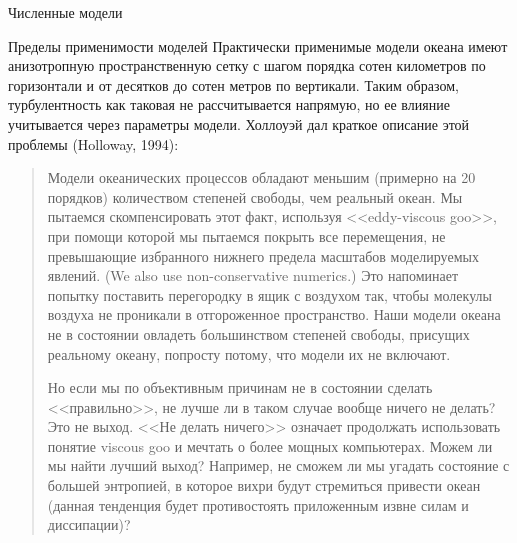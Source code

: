 \begin{chapter}{Численные модели}
\begin{section}{Пределы применимости моделей}
Практически применимые модели океана имеют анизотропную пространственную сетку 
с шагом порядка сотен километров по горизонтали и от десятков до сотен
метров по вертикали. Таким образом, турбулентность 
как таковая не рассчитывается напрямую, но ее влияние учитывается 
через параметры модели. Холлоуэй дал краткое описание этой
проблемы (Holloway, 1994):
%
\begin{quotation}
Модели океанических процессов обладают меньшим (примерно на 20 порядков)
количеством степеней свободы, чем реальный океан. Мы пытаемся скомпенсировать
этот факт, используя <<eddy-viscous goo>>, при помощи которой мы пытаемся
покрыть все перемещения, не превышающие избранного нижнего предела масштабов
моделируемых явлений. (We also use non-conservative numerics.) 
Это напоминает попытку поставить перегородку в ящик с воздухом так,
чтобы молекулы воздуха не проникали в отгороженное
пространство. Наши модели океана не в состоянии овладеть большинством
степеней свободы, присущих реальному океану, попросту потому, что модели
их не включают.
%

Но если мы по объективным причинам не в состоянии сделать <<правильно>>, 
не лучше ли в таком случае вообще ничего не делать? Это не выход. 
<<Не делать ничего>> означает продолжать использовать понятие viscous goo и 
мечтать о более мощных компьютерах. Можем ли мы найти лучший выход?
Например, не сможем ли мы угадать состояние с большей энтропией, в которое
вихри будут стремиться привести океан (данная тенденция будет противостоять
приложенным извне силам и диссипации)?
%
\end{quotation}


\end{section}
\end{chapter}
